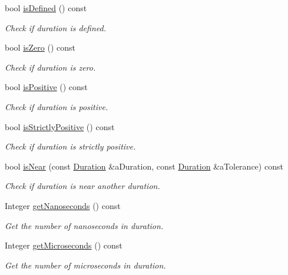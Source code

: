 \begin{DoxyCompactItemize}
bool \hyperlink{classostk_1_1physics_1_1time_1_1_duration_a4676fb2c4107f121bd197d4475507d40}{is\+Defined} () const
\begin{DoxyCompactList}\small\item\em Check if duration is defined. \end{DoxyCompactList}\item 
bool \hyperlink{classostk_1_1physics_1_1time_1_1_duration_a41b6aa4c574b3b98c32d5fafaa0a1fc2}{is\+Zero} () const
\begin{DoxyCompactList}\small\item\em Check if duration is zero. \end{DoxyCompactList}\item 
bool \hyperlink{classostk_1_1physics_1_1time_1_1_duration_a98211c27882beea4d5eadb6e825b85cb}{is\+Positive} () const
\begin{DoxyCompactList}\small\item\em Check if duration is positive. \end{DoxyCompactList}\item 
bool \hyperlink{classostk_1_1physics_1_1time_1_1_duration_ad72312f690761a3b5bfbe8ed0204d87e}{is\+Strictly\+Positive} () const
\begin{DoxyCompactList}\small\item\em Check if duration is strictly positive. \end{DoxyCompactList}\item 
bool \hyperlink{classostk_1_1physics_1_1time_1_1_duration_a89fe2dee0dec4b81040ecc7a31bb3f87}{is\+Near} (const \hyperlink{classostk_1_1physics_1_1time_1_1_duration}{Duration} \&a\+Duration, const \hyperlink{classostk_1_1physics_1_1time_1_1_duration}{Duration} \&a\+Tolerance) const
\begin{DoxyCompactList}\small\item\em Check if duration is near another duration. \end{DoxyCompactList}\item 
Integer \hyperlink{classostk_1_1physics_1_1time_1_1_duration_a6b5818c374c3535f7827f6970c563206}{get\+Nanoseconds} () const
\begin{DoxyCompactList}\small\item\em Get the number of nanoseconds in duration. \end{DoxyCompactList}\item 
Integer \hyperlink{classostk_1_1physics_1_1time_1_1_duration_a022d05824638f8288e84131d6b5e07be}{get\+Microseconds} () const
\begin{DoxyCompactList}\small\item\em Get the number of microseconds in duration. \end{DoxyCompactList}\item 

\end{DoxyCompactItemize}
